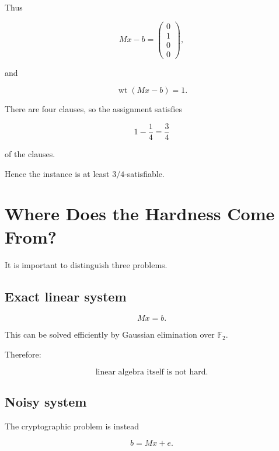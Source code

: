 \documentclass[11pt,a4paper]{article}
\newcommand{\F}{\mathbb{F}}
\newcommand{\wt}{\operatorname{wt}}
\begin{document}
Thus

\begin{equation}
Mx-b
=
\begin{pmatrix}
0\\1\\0\\0
\end{pmatrix},
\end{equation}

and

\begin{equation}
\wt(Mx-b)=1.
\end{equation}

There are four clauses, so the assignment satisfies

\begin{equation}
    1-\frac14=\frac34
\end{equation}

of the clauses.

Hence the instance is at least $3/4$-satisfiable.

\section{Where Does the Hardness Come From?}

It is important to distinguish three problems.

\subsection{Exact linear system}

\begin{equation}
    Mx=b.
\end{equation}

This can be solved efficiently by Gaussian elimination over $\F_2$.

Therefore:

\begin{equation}
    \boxed{\text{linear algebra itself is not hard}.}
\end{equation}

\subsection{Noisy system}

The cryptographic problem is instead

\begin{equation}
    b=Mx+e.
\end{equation}
\end{document}
